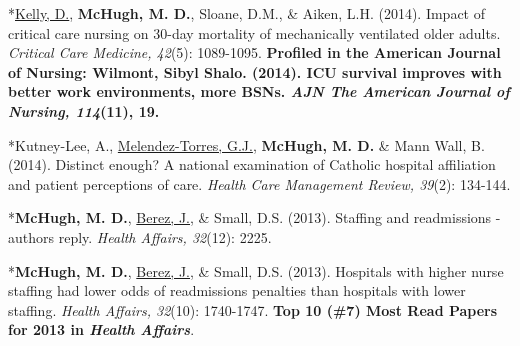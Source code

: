 \documentclass[10pt,]{article}
\begin{document}
{{{{{{{{{{{{{{{\begin{hangparas}{.25in}{1}
\end{hangparas}



\begin{hangparas}{.25in}{1}

*{\underline {Kelly, D.}}, {\textbf {McHugh, M. D.}}, Sloane, D.M., \& Aiken, L.H. (2014). Impact of critical care nursing on 30-day mortality of mechanically ventilated older adults. {\textit {Critical Care Medicine, 42}}(5): 1089-1095. {\textbf {Profiled in the American Journal of Nursing: Wilmont, Sibyl Shalo. (2014). ICU survival improves with better work environments, more BSNs. {\textit {AJN The American Journal of Nursing, 114}}(11), 19.}}

\end{hangparas}



\begin{hangparas}{.25in}{1}

*Kutney-Lee, A., {\underline {Melendez-Torres, G.J.}}, {\textbf {McHugh, M. D.}} \& Mann Wall, B. (2014). Distinct enough? A national examination of Catholic hospital affiliation and patient perceptions of care. {\textit {Health Care Management Review, 39}}(2): 134-144.

\end{hangparas}



\begin{hangparas}{.25in}{1}

*{\textbf {McHugh, M. D.}}, {\underline {Berez, J.}}, \& Small, D.S. (2013). Staffing and readmissions - authors reply. {\textit {Health Affairs, 32}}(12): 2225.

\end{hangparas}



\begin{hangparas}{.25in}{1}

*{\textbf {McHugh, M. D.}}, {\underline {Berez, J.}}, \& Small, D.S. (2013). Hospitals with higher nurse staffing had lower odds of readmissions penalties than hospitals with lower staffing. {\textit {Health Affairs, 32}}(10): 1740-1747. {\textbf {Top 10 (\#7) Most Read Papers for 2013 in {\textit {Health Affairs}}}}.

\end{hangparas}



\begin{hangparas}{.25in}{1}


\end{hangparas}}}}}}}}}}}}}}}}
\end{document}
